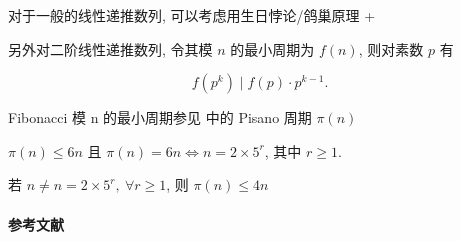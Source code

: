 对于一般的线性递推数列, 可以考虑用生日悖论/鸽巢原理 + 

另外对二阶线性递推数列, 令其模 \(n\) 的最小周期为 \(f(n)\), 则对素数 \(p\) 有

\[
    f\left(p^k\right)\mid f(p)\cdot p^{k-1}.
\]

Fibonacci 模 n 的最小周期参见  中的 Pisano 周期 \(\pi(n)\)

\(\pi(n)\leq 6n\) 且 \(\pi(n)=6n\iff n=2\times 5^r\), 其中 \(r\geq 1\).

若 \(n\neq n=2\times 5^r,~\forall r\geq 1\), 则 \(\pi(n)\leq 4n\)

\paragraph{参考文献} \cite{enwiki:1213681016}
